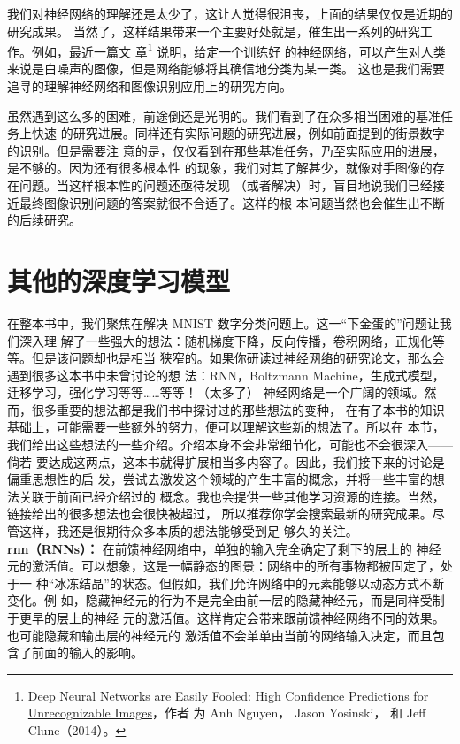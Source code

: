 我们对神经网络的理解还是太少了，这让人觉得很沮丧，上面的结果仅仅是近期的研究成果。
当然了，这样结果带来一个主要好处就是，催生出一系列的研究工作。例如，最近一篇文
章\footnote{\href{http://arxiv.org/abs/1412.1897}{Deep Neural Networks are
    Easily Fooled: High Confidence Predictions for Unrecognizable Images}，作者
  为 Anh Nguyen， Jason Yosinski， 和 Jeff Clune（2014）。} 说明，给定一个训练好
的神经网络，可以产生对人类来说是白噪声的图像，但是网络能够将其确信地分类为某一类。
这也是我们需要追寻的理解神经网络和图像识别应用上的研究方向。

虽然遇到这么多的困难，前途倒还是光明的。我们看到了在众多相当困难的基准任务上快速
的研究进展。同样还有实际问题的研究进展，例如前面提到的街景数字的识别。但是需要注
意的是，仅仅看到在那些基准任务，乃至实际应用的进展，是不够的。因为还有很多根本性
的现象，我们对其了解甚少，就像对手图像的存在问题。当这样根本性的问题还亟待发现
（或者解决）时，盲目地说我们已经接近最终图像识别问题的答案就很不合适了。这样的根
本问题当然也会催生出不断的后续研究。

\section{其他的深度学习模型}
\label{sec:other_approaches_to_deep_neural_nets}

在整本书中，我们聚焦在解决 MNIST 数字分类问题上。这一“下金蛋的”问题让我们深入理
解了一些强大的想法：随机梯度下降，反向传播，卷积网络，正规化等等。但是该问题却也是相当
狭窄的。如果你研读过神经网络的研究论文，那么会遇到很多这本书中未曾讨论的想
法：RNN，Boltzmann Machine，生成式模型，迁移学习，强化学习等等……等等！（太多了）
神经网络是一个广阔的领域。然而，很多重要的想法都是我们书中探讨过的那些想法的变种，
在有了本书的知识基础上，可能需要一些额外的努力，便可以理解这些新的想法了。所以在
本节，我们给出这些想法的一些介绍。介绍本身不会非常细节化，可能也不会很深入——倘若
要达成这两点，这本书就得扩展相当多内容了。因此，我们接下来的讨论是偏重思想性的启
发，尝试去激发这个领域的产生丰富的概念，并将一些丰富的想法关联于前面已经介绍过的
概念。我也会提供一些其他学习资源的连接。当然，链接给出的很多想法也会很快被超过，
所以推荐你学会搜索最新的研究成果。尽管这样，我还是很期待众多本质的想法能够受到足
够久的关注。\\

\textbf{\gls*{rnn}（RNNs）：} 在前馈神经网络中，单独的输入完全确定了剩下的层上的
神经元的激活值。可以想象，这是一幅静态的图景：网络中的所有事物都被固定了，处于一
种“冰冻结晶”的状态。但假如，我们允许网络中的元素能够以动态方式不断变化。例
如，隐藏神经元的行为不是完全由前一层的隐藏神经元，而是同样受制于更早的层上的神经
元的激活值。这样肯定会带来跟前馈神经网络不同的效果。也可能隐藏和输出层的神经元的
激活值不会单单由当前的网络输入决定，而且包含了前面的输入的影响。

